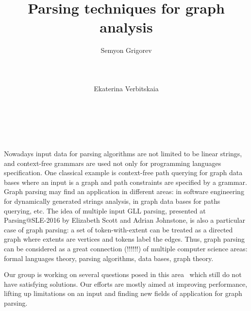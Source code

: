 \documentclass{vldb}
\begin{document}
\makeatletter
\def\@copyrightspace{\relax}
\makeatother


\title{Parsing techniques for graph analysis}



\author{
\alignauthor
       Semyon Grigorev\\
       \\
       \\
       \\
\alignauthor
       Ekaterina Verbitskaia\\
       \\
       \\
       \\
}


\maketitle
Nowadays input data for parsing algorithms are not limited to be linear strings, and context-free grammars are used not only for programming languages specification.
One classical example is context-free path querying for graph data bases where an input is a graph and path constraints are specified by a grammar.
Graph parsing may find an application in different areas: in software engineering for dynamically generated strings analysis, in graph data bases for paths querying, etc.
The idea of multiple input GLL parsing, presented at Parsing@SLE-2016 by Elizabeth Scott and Adrian Johnstone, is also a particular case of graph parsing: 
a set of token-with-extent can be treated as a directed graph where extents are vertices and tokens label the edges.
Thus, graph parsing can be considered as a great connection (!!!!!!) of multiple computer science areas: formal languages theory, parsing algorithms, data bases, graph theory.

Our group is working on several questions posed in this area~\cite{Hellings, Yannakakis} which still do not have satisfying solutions.
Our efforts are mostly aimed at improving performance, lifting up limitations on an input and finding new fields of application for graph parsing. 
\end{document}
